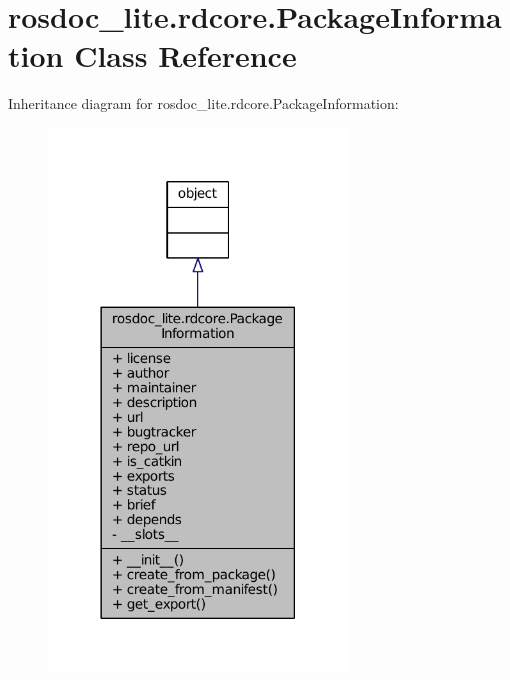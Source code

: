 \hypertarget{classrosdoc__lite_1_1rdcore_1_1PackageInformation}{}\section{rosdoc\+\_\+lite.\+rdcore.\+Package\+Information Class Reference}
\label{classrosdoc__lite_1_1rdcore_1_1PackageInformation}


Inheritance diagram for rosdoc\+\_\+lite.\+rdcore.\+Package\+Information\+:
\nopagebreak
\begin{figure}[H]
\begin{center}
\leavevmode
\includegraphics[width=225pt]{classrosdoc__lite_1_1rdcore_1_1PackageInformation__inherit__graph}
\end{center}
\end{figure}


